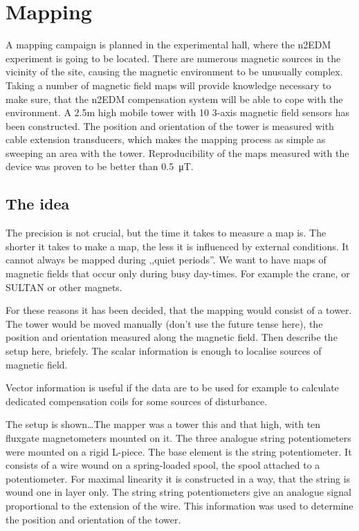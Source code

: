 \chapter{Mapping}
A mapping campaign is planned in the experimental hall, where the n2EDM experiment is going to be located. There are numerous magnetic sources in the vicinity of the site, causing the magnetic environment to be unusually complex. Taking a number of magnetic field maps will provide knowledge necessary to make sure, that the n2EDM compensation system will be able to cope with the environment. A 2.5m high mobile tower with 10 3-axis magnetic field sensors has been constructed. The position and orientation of the tower is measured with cable extension transducers, which makes the mapping process as simple as sweeping an area with the tower. Reproducibility of the maps measured with the device was proven to be better than \SI{0.5}{\micro\tesla}.


\section{The idea}
The precision is not crucial, but the time it takes to measure a map is. The shorter it takes to make a map, the less it is influenced by external conditions. It cannot always be mapped during ,,quiet periods''. We want to have maps of magnetic fields that occur only during busy day-times. For example the crane, or SULTAN or other magnets.

For these reasons it has been decided, that the mapping would consist of a tower. The tower would be moved manually (don't use the future tense here), the position and orientation measured along the magnetic field. Then describe the setup here, briefely. The scalar information is enough to localise sources of magnetic field.

Vector information is useful if the data are to be used for example to calculate dedicated compensation coils for some sources of disturbance.

The setup is shown\ldots The mapper was a tower this and that high, with ten fluxgate magnetometers mounted on it.
The three analogue string potentiometers were mounted on a rigid L-piece. The base element is the string potentiometer. It consists of a wire wound on a spring-loaded spool, the spool attached to a potentiometer. For maximal linearity it is constructed in a way, that the string is wound one in layer only. The string string potentiometers give an analogue signal proportional to the extension of the wire. This information was used to determine the position and orientation of the tower.


